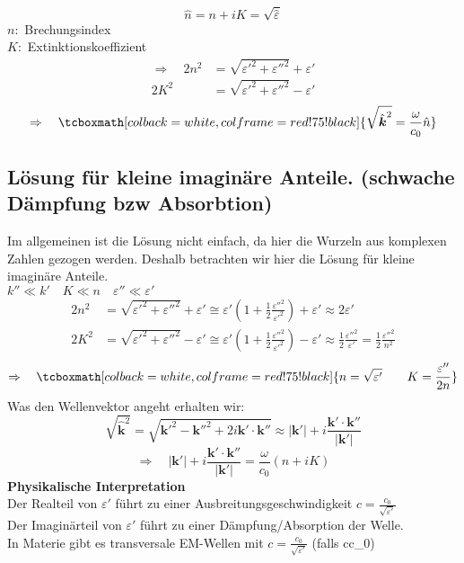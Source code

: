 \documentclass[titlepage,11pt,a4paper,ngerman]{report}
\renewcommand{\vec}[1]{\boldsymbol{#1}}
\renewcommand{\epsilon}{\varepsilon}
\newcommand{\rmbox}[1]{\tcboxmath[colback=white,colframe=red!75!black]{#1}}
\begin{document}
\begin{equation*}
\hat{n} = n + i K = \sqrt{\hat{\epsilon}}
\end{equation*}
$ n : $ Brechungsindex\\
$ K : $ Extinktionskoeffizient
\begin{align*}
\Rightarrow \quad 2 n^2 &= \sqrt{\epsilon'^2 + \epsilon''^2} + \epsilon'\\
2 K^2 &= \sqrt{\epsilon'^2 + \epsilon''^2} - \epsilon'
\end{align*}
\begin{equation*}
\Rightarrow \quad \rmbox{\sqrt{\hat{\vec{k}}^2 } = \frac{\omega}{c_0} \hat{n}}
\end{equation*}

\subsection{Lösung für kleine imaginäre Anteile. (schwache Dämpfung bzw Absorbtion)}

Im allgemeinen ist die Lösung nicht einfach, da hier die Wurzeln aus komplexen Zahlen gezogen werden. Deshalb betrachten wir hier die Lösung für kleine imaginäre Anteile.\\
$ k'' \ll k' \quad K \ll n \quad \epsilon'' \ll \epsilon' $
\begin{align*}
2n^2 &= \sqrt{\epsilon'^2 + \epsilon''^2} + \epsilon' \cong \epsilon' \left(1 + \frac{1}{2} \frac{\epsilon''^2}{\epsilon'^2}\right) + \epsilon' \approx 2 \epsilon' \\
2K^2 &= \sqrt{\epsilon'^2 + \epsilon''^2} - \epsilon' \cong \epsilon' \left(1 + \frac{1}{2} \frac{\epsilon''^2}{\epsilon'^2}\right) - \epsilon' \approx \frac{1}{2} \frac{\epsilon''^2}{\epsilon'} = \frac{1}{2} \frac{\epsilon''^2}{n^2}
\end{align*}
\begin{equation*}
\Rightarrow \quad \rmbox{n = \sqrt{\epsilon'} \qquad K = \frac{\epsilon''}{2n}}
\end{equation*}
Was den Wellenvektor angeht erhalten wir:
\begin{equation*}
\sqrt{\hat{\vec{k}}^2} = \sqrt{\vec{k}'^2 - \vec{k}''^2 + 2 i \vec{k}' \cdot \vec{k}''} \approx | \vec{k}' | + i \frac{\vec{k}' \cdot \vec{k}''}{|\vec{k}'|}
\end{equation*}
\begin{equation*}
\Rightarrow \quad |\vec{k}'|  + i \frac{\vec{k}' \cdot \vec{k}''}{|\vec{k}'|} = \frac{\omega}{c_0} (n + i K)
\end{equation*}
\textbf{Physikalische Interpretation}\\[5pt]
Der Realteil von $\epsilon'$ führt zu einer Ausbreitungsgeschwindigkeit $ c = \frac{c_0}{\sqrt{\epsilon'}} $\\
Der Imaginärteil von $\epsilon'$ führt zu einer Dämpfung/Absorption der Welle.\\
\rightarrow In Materie gibt es transversale EM-Wellen mit $ c = \frac{c_0}{\sqrt{\epsilon'}}$ (falls c\leq c_0)
\end{document}
